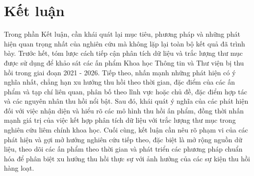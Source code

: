 \section{Kết luận}

Trong phần Kết luận, cần khái quát lại mục tiêu, phương pháp và những phát hiện quan trọng nhất của nghiên cứu mà không lặp lại toàn bộ kết quả đã trình bày. Trước hết, tóm lược cách tiếp cận phân tích dữ liệu và trắc lượng thư mục được sử dụng để khảo sát các ấn phẩm Khoa học Thông tin và Thư viện bị thu hồi trong giai đoạn 2021 - 2026. Tiếp theo, nhấn mạnh những phát hiện có ý nghĩa nhất, chẳng hạn xu hướng thu hồi theo thời gian, đặc điểm của các ấn phẩm và tạp chí liên quan, phân bố theo lĩnh vực hoặc chủ đề, đặc điểm hợp tác và các nguyên nhân thu hồi nổi bật. Sau đó, khái quát ý nghĩa của các phát hiện đối với việc nhận diện và hiểu rõ các mô hình thu hồi ấn phẩm, đồng thời nhấn mạnh giá trị của việc kết hợp phân tích dữ liệu với trắc lượng thư mục trong nghiên cứu liêm chính khoa học. Cuối cùng, kết luận cần nêu rõ phạm vi của các phát hiện và gợi mở hướng nghiên cứu tiếp theo, đặc biệt là mở rộng nguồn dữ liệu, theo dõi các ấn phẩm theo thời gian và phát triển các phương pháp chuẩn hóa để phân biệt xu hướng thu hồi thực sự với ảnh hưởng của các sự kiện thu hồi hàng loạt.